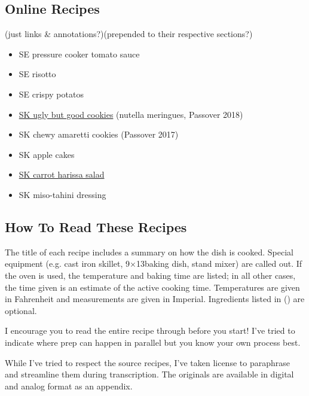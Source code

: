 \subsection{Online Recipes}
(just links \& annotations?)(prepended to their respective sections?)
\begin{itemize}
 \item SE pressure cooker tomato sauce
 \item SE risotto
 \item SE crispy potatos
 \item \href{https://smittenkitchen.com/2016/01/ugly-but-good-cookies/}{SK ugly but good cookies} (nutella meringues, Passover 2018)
 \item SK chewy amaretti cookies (Passover 2017)
 \item SK apple cakes
 \item \href{https://smittenkitchen.com/2010/05/carrot-salad-with-harissa-feta-and-mint/}{SK carrot harissa salad}
 \item SK miso-tahini dressing
\end{itemize}

\subsection{How To Read These Recipes}
The title of each recipe includes a summary on how the dish is cooked. Special equipment (e.g. cast iron skillet, 9\inch$\times$13\inch baking dish, stand mixer) are called out. If the oven is used, the temperature and baking time are listed; in all other cases, the time given is an estimate of the active cooking time. Temperatures are given in Fahrenheit and measurements are given in Imperial. Ingredients listed in () are optional.

I encourage you to read the entire recipe through before you start! I've tried to indicate where prep can happen in parallel but you know your own process best.

While I've tried to respect the source recipes, I've taken license to paraphrase and streamline them during transcription. The originals are available in digital and analog format as an appendix.
